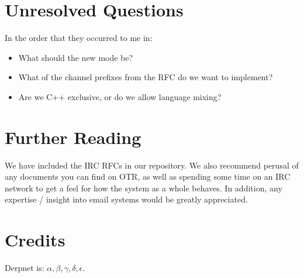 \documentclass[11pt]{article}
\begin{document}
\section{Unresolved Questions}

In the order that they occurred to me in:

\begin{itemize}
\item 
  What should the new mode be?
\item
  What of the channel prefixes from the RFC do we want to implement?
\item
  Are we C++ exclusive, or do we allow language mixing?
\end{itemize}

\section{Further Reading}

We have included the IRC RFCs in our repository.  We also recommend perusal of
any documents you can find on OTR, as well as spending some time on an IRC
network to get a feel for how the system as a whole behaves.  In addition, any
expertise / insight into email systems would be greatly appreciated.

\section{Credits}

Derpnet is: $\alpha, \beta, \gamma, \delta, \epsilon$.
\end{document}
